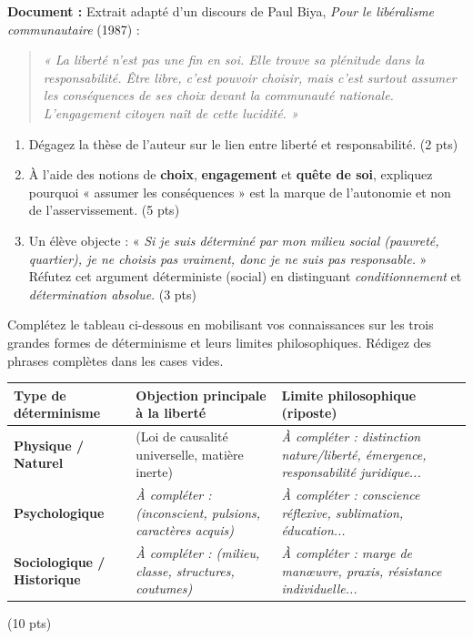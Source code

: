 \documentclass[11pt]{article}
\begin{document}
\begin{exercice}
\textbf{Document :} Extrait adapté d'un discours de Paul Biya, \textit{Pour le libéralisme communautaire} (1987) : 
\begin{quote}
\textit{« La liberté n'est pas une fin en soi. Elle trouve sa plénitude dans la responsabilité. Être libre, c'est pouvoir choisir, mais c'est surtout assumer les conséquences de ses choix devant la communauté nationale. L'engagement citoyen naît de cette lucidité. »}
\end{quote}
\begin{enumerate}
    \item Dégagez la thèse de l'auteur sur le lien entre liberté et responsabilité. \hfill (2 pts)
    \item À l'aide des notions de \textbf{choix}, \textbf{engagement} et \textbf{quête de soi}, expliquez pourquoi « assumer les conséquences » est la marque de l'autonomie et non de l'asservissement. \hfill (5 pts)
    \item Un élève objecte : « \textit{Si je suis déterminé par mon milieu social (pauvreté, quartier), je ne choisis pas vraiment, donc je ne suis pas responsable.} » Réfutez cet argument déterministe (social) en distinguant \textit{conditionnement} et \textit{détermination absolue}. \hfill (3 pts)
\end{enumerate}
\end{exercice}

\begin{exercice}
Complétez le tableau ci-dessous en mobilisant vos connaissances sur les trois grandes formes de déterminisme et leurs limites philosophiques. Rédigez des phrases complètes dans les cases vides.

\begin{tabularx}{\linewidth}{|>{\bfseries}X|X|X|}
\hline
\textbf{Type de déterminisme} & \textbf{Objection principale à la liberté} & \textbf{Limite philosophique (riposte)} \\
\hline
\textbf{Physique / Naturel} & (Loi de causalité universelle, matière inerte) & \textit{À compléter : distinction nature/liberté, émergence, responsabilité juridique...} \\
\hline
\textbf{Psychologique} & \textit{À compléter : (inconscient, pulsions, caractères acquis)} & \textit{À compléter : conscience réflexive, sublimation, éducation...} \\
\hline
\textbf{Sociologique / Historique} & \textit{À compléter : (milieu, classe, structures, coutumes)} & \textit{À compléter : marge de manœuvre, praxis, résistance individuelle...} \\
\hline
\end{tabularx}
\hfill (10 pts)
\end{exercice}
\end{document}
